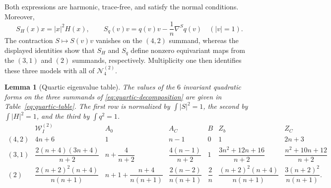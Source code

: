 \documentclass[reqno,11pt]{amsart}
\newtheorem{lemma}[theorem]{Lemma}
\theoremstyle{definition}
\begin{document}
Both expressions are harmonic, trace-free, and satisfy the normal
conditions.  Moreover,
$$
  S_H(x)x=|x|^2H(x),
  \qquad
  S_q(v)v=q(v)v-\frac1n\nabla^Sq(v)
  \quad(|v|=1).
$$
The contraction $S\mapsto S(v)v$ vanishes on the $(4,2)$ summand, whereas
the displayed identities show that $S_H$ and $S_q$ define nonzero equivariant
maps from the $(3,1)$ and $(2)$ summands, respectively. Multiplicity one then
identifies these three models with all of $\mathscr N^{(2)}_4$.

\begin{lemma}[Quartic eigenvalue table]
\label{lem:quartic-table}
The values of the $6$ invariant quadratic forms on the three summands of
\eqref{eq:quartic-decomposition} are given in
Table~\eqref{eq:quartic-table}.  The first row is normalized by
$\int|S|^2=1$, the second by $\int|H|^2=1$, and the third by
$\int q^2=1$.
\begin{equation}\label{eq:quartic-table}
\begin{array}{c|cccccc}
 &\mathscr W_I^{(2)}&A_0&A_C&B&Z_b&Z_C\\ \hline
(4,2)
&4n+6
&1
&n-1
&0
&1
&2n+3\\[2mm]
(3,1)
&\dfrac{2(n+4)(3n+4)}{n+2}
&n+\dfrac4{n+2}
&\dfrac{4(n-1)}{n+2}
&1
&\dfrac{3n^2+12n+16}{n+2}
&\dfrac{n^2+10n+12}{n+2}\\[4mm]
(2)
&\dfrac{2(n+2)^2(n+4)}{n(n+1)}
&n+1+\dfrac{n+4}{n(n+1)}
&\dfrac{2(n-2)}{n(n+1)}
&\dfrac2n
&\dfrac{(n+2)^2(n+4)}{n(n+1)}
&\dfrac{3(n+2)^2}{n(n+1)}.
\end{array}
\end{equation}
\end{lemma}
\end{document}
